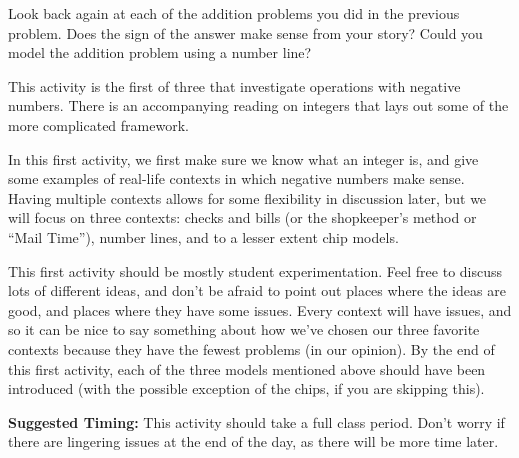\documentclass{ximera}
\begin{document}
\begin{problem}
Look back again at each of the addition problems you did in the previous problem.  Does the sign of the answer make sense from your story?  Could you model the addition problem using a number line?

\end{problem}


\newpage
\begin{instructorNotes}
This activity is the first of three that investigate operations with negative numbers.  There is an accompanying reading on integers that lays out some of the more complicated framework.

In this first activity, we first make sure we know what an integer is, and give some examples of real-life contexts in which negative numbers make sense.  Having multiple contexts allows for some flexibility in discussion later, but we will focus on three contexts: checks and bills (or the shopkeeper's method or ``Mail Time''), number lines, and to a lesser extent chip models.

This first activity should be mostly student experimentation.  Feel free to discuss lots of different ideas, and don't be afraid to point out places where the ideas are good, and places where they have some issues.  Every context will have issues, and so it can be nice to say something about how we've chosen our three favorite contexts because they have the fewest problems (in our opinion).  By the end of this first activity, each of the three models mentioned above should have been introduced (with the possible exception of the chips, if you are skipping this).

{\bf Suggested Timing:} This activity should take a full class period.  Don't worry if there are lingering issues at the end of the day, as there will be more time later.
\end{instructorNotes}
\end{document}
